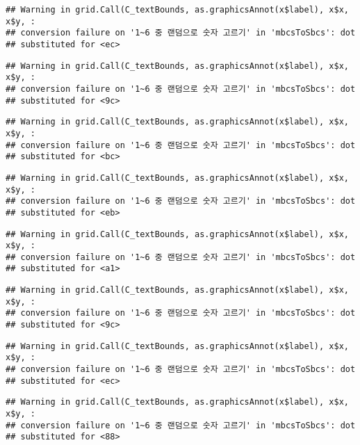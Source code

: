 \documentclass[]{book}
\begin{document}
\begin{verbatim}
## Warning in grid.Call(C_textBounds, as.graphicsAnnot(x$label), x$x, x$y, :
## conversion failure on '1~6 중 랜덤으로 숫자 고르기' in 'mbcsToSbcs': dot
## substituted for <ec>
\end{verbatim}

\begin{verbatim}
## Warning in grid.Call(C_textBounds, as.graphicsAnnot(x$label), x$x, x$y, :
## conversion failure on '1~6 중 랜덤으로 숫자 고르기' in 'mbcsToSbcs': dot
## substituted for <9c>
\end{verbatim}

\begin{verbatim}
## Warning in grid.Call(C_textBounds, as.graphicsAnnot(x$label), x$x, x$y, :
## conversion failure on '1~6 중 랜덤으로 숫자 고르기' in 'mbcsToSbcs': dot
## substituted for <bc>
\end{verbatim}

\begin{verbatim}
## Warning in grid.Call(C_textBounds, as.graphicsAnnot(x$label), x$x, x$y, :
## conversion failure on '1~6 중 랜덤으로 숫자 고르기' in 'mbcsToSbcs': dot
## substituted for <eb>
\end{verbatim}

\begin{verbatim}
## Warning in grid.Call(C_textBounds, as.graphicsAnnot(x$label), x$x, x$y, :
## conversion failure on '1~6 중 랜덤으로 숫자 고르기' in 'mbcsToSbcs': dot
## substituted for <a1>
\end{verbatim}

\begin{verbatim}
## Warning in grid.Call(C_textBounds, as.graphicsAnnot(x$label), x$x, x$y, :
## conversion failure on '1~6 중 랜덤으로 숫자 고르기' in 'mbcsToSbcs': dot
## substituted for <9c>
\end{verbatim}

\begin{verbatim}
## Warning in grid.Call(C_textBounds, as.graphicsAnnot(x$label), x$x, x$y, :
## conversion failure on '1~6 중 랜덤으로 숫자 고르기' in 'mbcsToSbcs': dot
## substituted for <ec>
\end{verbatim}

\begin{verbatim}
## Warning in grid.Call(C_textBounds, as.graphicsAnnot(x$label), x$x, x$y, :
## conversion failure on '1~6 중 랜덤으로 숫자 고르기' in 'mbcsToSbcs': dot
## substituted for <88>
\end{verbatim}
\end{document}
